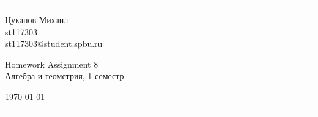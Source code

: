 \documentclass[a4paper, 12pt]{article}
\begin{document}

\fancyhead[C]{}
\hrule \medskip %
\begin{minipage}{0.295\textwidth} 
\raggedright\footnotesize
Цуканов Михаил \hfill\\   
st117303 \hfill\\
st117303@student.spbu.ru
\end{minipage}
\begin{minipage}{0.4\textwidth} 
\centering\large 
Homework Assignment 8\\ 
\normalsize 
Алгебра и геометрия, 1 семестр\\ 
\end{minipage}
\begin{minipage}{0.295\textwidth} 
\raggedleft
\today\hfill\\
\end{minipage}
\medskip\hrule 
\bigskip

\end{document}
